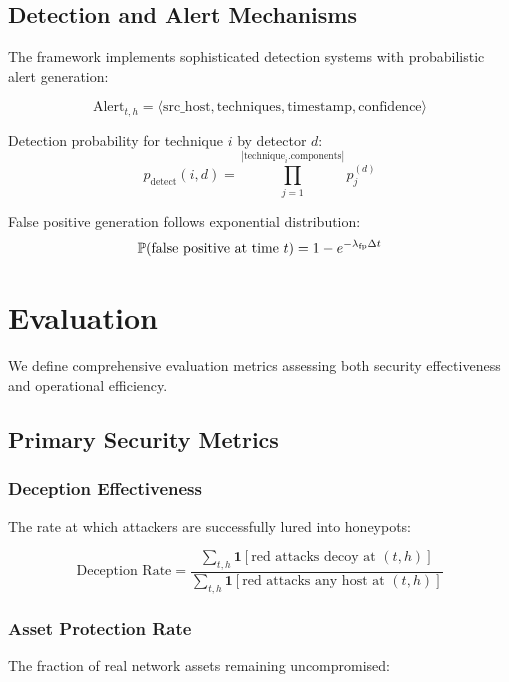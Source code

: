 \documentclass[11pt]{article}
\theoremstyle{definition}
\theoremstyle{plain}
\begin{document}
\subsection{Detection and Alert Mechanisms}

The framework implements sophisticated detection systems with probabilistic alert generation:

\begin{equation}
\text{Alert}_{t,h} = \langle \text{src\_host}, \text{techniques}, \text{timestamp}, \text{confidence} \rangle
\end{equation}

Detection probability for technique $i$ by detector $d$:
\begin{equation}
p_{\text{detect}}(i, d) = \prod_{j=1}^{|\text{technique}_i.\text{components}|} p_j^{(d)}
\end{equation}

False positive generation follows exponential distribution:
\begin{equation}
\mathbb{P}(\text{false positive at time } t) = 1 - e^{-\lambda_{\text{fp}} \Delta t}
\end{equation}

\section{Evaluation}

We define comprehensive evaluation metrics assessing both security effectiveness and operational efficiency.

\subsection{Primary Security Metrics}

\subsubsection{Deception Effectiveness}
The rate at which attackers are successfully lured into honeypots:

\begin{equation}
\text{Deception Rate} = \frac{\sum_{t,h} \mathbf{1}[\text{red attacks decoy at } (t,h)]}{\sum_{t,h} \mathbf{1}[\text{red attacks any host at } (t,h)]}
\end{equation}

\subsubsection{Asset Protection Rate}
The fraction of real network assets remaining uncompromised:
\end{document}
